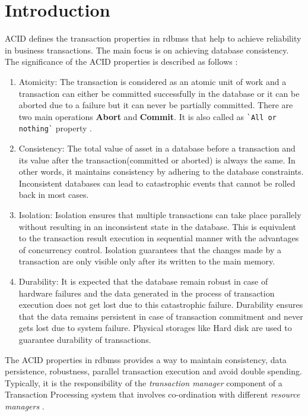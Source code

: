 \documentclass[
  a4paper,  %
  twoside,  %
  bibliography=totoc,
  headsepline,
  cleardoublepage=empty,
  parskip=half,
  draft=false
]{scrbook}
\begin{document}
%
%


\chapter{Introduction}

ACID defines the transaction properties in \glspl{rdbms} that help to achieve reliability in business transactions. The main focus is on achieving database consistency. The significance of the ACID properties is described as follows :
\begin{enumerate}
  \item Atomicity: The transaction is considered as an atomic unit of work and a transaction can either be committed successfully in the database or it can be aborted due to a failure but it can never be partially committed. There are two main operations \textbf{Abort} and \textbf{Commit}. It is also called as \verb|`All or nothing`| property \cite{Atomicity}.
  \item Consistency: The total value of asset in a database before a transaction and its value after the transaction(committed or aborted) is always the same. In other words, it maintains consistency by adhering to the database constraints. Inconsistent databases can lead to catastrophic events that cannot be rolled back in most cases.
  \item Isolation: Isolation ensures that multiple transactions can take place parallely without resulting in an inconsistent state in the database. This is equivalent to the transaction result execution in sequential manner with the advantages of concurrency control. Isolation guarantees that the changes made by a transaction are only visible only after its written to the main memory.
  \item Durability: It is expected that the database remain robust in case of hardware failures and the data generated in the process of transaction execution does not get lost due to this catastrophic failure. Durability ensures that the data remains persistent in case of transaction commitment and never gets lost due to system failure. Physical storages like Hard disk are used to guarantee durability of transactions.
\end{enumerate}

The ACID properties in \glspl{rdbms} provides a way to maintain consistency, data persistence, robustness, parallel transaction execution and avoid double spending. Typically, it is the responsibility of the \textit{transaction manager} component of a Transaction Processing system that involves co-ordination with different \textit{resource managers} \cite{Salt}. 
\end{document}
